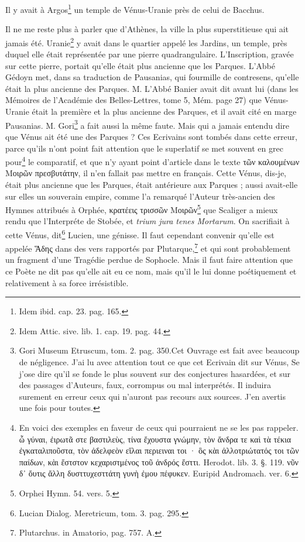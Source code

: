 \documentclass[a4paper, 18pt, oneside]{article}
\begin{document}
Il y avait à Argos\footnote{Idem ibid. cap. 23. pag. 165.} un temple de Vénus-Uranie près de celui de Bacchus.

Il ne me reste plus à parler que d'Athènes, la ville la plus superstitieuse qui ait jamais été. Uranie\footnote{Idem Attic. sive. lib. 1. cap. 19. pag. 44.} y avait dans le quartier appelé les Jardins, un temple, près duquel elle était représentée par une pierre quadrangulaire. L'Inscription, gravée sur cette pierre, portait qu'elle était plus ancienne que les Parques. L'Abbé Gédoyn met, dans sa traduction de Pausanias, qui fourmille de contresens, qu'elle était la plus ancienne des Parques. M. L'Abbé Banier avait dit avant lui (dans les Mémoires de l'Académie des Belles-Lettres, tome 5, Mém. page 27) que Vénus-Uranie était la première et la plus ancienne des Parques, et il avait cité en marge Pausanias. M. Gori\footnote{Gori Museum Etruscum, tom. 2. pag. 350.Cet Ouvrage est fait avec beaucoup de négligence. J'ai lu avec attention tout ce que cet Ecrivain dit sur Vénus, Se j'ose dire qu'il se fonde le plus souvent sur des conjectures hasardées, et sur des passages d'Auteurs, faux, corrompus ou mal interprétés. Il induira surement en erreur ceux qui n'auront pas recours aux sources. J'en avertis une fois pour toutes.} a fait aussi la même faute. Mais qui a jamais entendu dire que Vénus ait été une des Parques ? Ces Ecrivains sont tombés dans cette erreur, parce qu'ils n'ont point fait attention que le superlatif se met souvent en grec pour\footnote{En voici des exemples en faveur de ceux qui pourraient ne se les pas rappeler. ὧ γύναι, ἐιρωτᾶ στε βαστιλεὺς, τίνα ἔχουστα γνώμην, τὸν ἄνδρα τε καὶ τὰ τέκια ἐγκαταλιποῦστα, τὸν ἀδελφεὸν εἵλαι περιειναι τοι · ὃς κὰι ἀλλοτριώτατός τοι τῶν παίδων, κὰι ἕστστον κεχαριστμένος τοῦ ἀνδρός ἔσττι. Herodot. lib. 3. §. 119. νῦν δ᾽ ὄυτις ἄλλη δυσττυχεσττάτη γυνὴ ἐμου πέφυκεν. Euripid Andromach. ver. 6.} le comparatif, et que n'y ayant point d'article dans le texte τῶν καλουμένων Μοιρῶν πρεσβυτάτην, il n'en fallait pas mettre en français. Cette Vénus, dis-je, était plus ancienne que les Parques, était antérieure aux Parques ; aussi avait-elle sur elles un souverain empire, comme l'a remarqué l'Auteur très-ancien des Hymnes attribués à Orphée, κρατέεις τρισσῶν Μοιρῶν\footnote{Orphei Hymn. 54. vers. 5.} que Scaliger a mieux rendu que l'Interpréte de Stobée, et \emph{trium jura tenes Mortarum}. On sacrifiait à cette Vénus, dit\footnote{Lucian Dialog. Meretricum, tom. 3. pag. 295.} Lucien, une génisse. Il faut cependant convenir qu'elle est appelée Ἅδης dans des vers rapportés par Plutarque,\footnote{Plutarchus. in Amatorio, pag. 757. A.} et qui sont probablement un fragment d'une Tragédie perdue de Sophocle. Mais il faut faire attention que ce Poète ne dit pas qu'elle ait eu ce nom, mais qu'il le lui donne poétiquement et relativement à sa force irrésistible.
\end{document}

